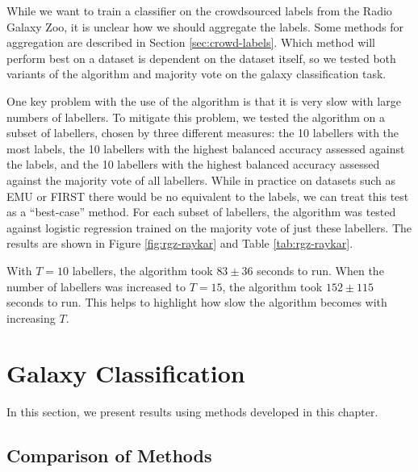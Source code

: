   While we want to train a classifier on the crowdsourced labels from the Radio
  Galaxy Zoo, it is unclear how we should aggregate the labels. Some methods for
  aggregation are described in Section \ref{sec:crowd-labels}. Which method will
  perform best on a dataset is dependent on the dataset itself, so we tested
  both variants of the \citeauthor{raykar10} algorithm and majority vote on the
  galaxy classification task.

  One key problem with the use of the \citeauthor{raykar10} algorithm is that it
  is very slow with large numbers of labellers. To mitigate this problem, we
  tested the algorithm on a subset of labellers, chosen by three different
  measures: the 10 labellers with the most labels, the 10 labellers with the
  highest balanced accuracy assessed against the \citeauthor{norris06} labels,
  and the 10 labellers with the highest balanced accuracy assessed against the
  majority vote of all labellers. While in practice on datasets such as EMU or
  FIRST there would be no equivalent to the \citeauthor{norris06} labels, we can
  treat this test as a ``best-case'' method. For each subset of labellers, the
  \citeauthor{raykar10} algorithm was tested against logistic regression trained
  on the majority vote of just these labellers. The results are shown in Figure
  \ref{fig:rgz-raykar} and Table \ref{tab:rgz-raykar}.

  With $T = 10$ labellers, the \citeauthor{raykar10} algorithm took $83 \pm 36$
  seconds to run. When the number of labellers was increased to $T = 15$, the
  \citeauthor{raykar10} algorithm took $152 \pm 115$ seconds to run. This helps
  to highlight how slow the algorithm becomes with increasing $T$.

\section{Galaxy Classification}
\label{sec:rgz-results}

  In this section, we present results using methods developed in this chapter.

  \subsection{Comparison of Methods}
  \label{sec:comparison-predictors}

